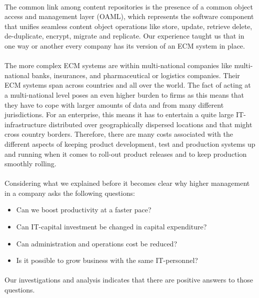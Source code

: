 \documentclass[EPiC]{easychair} %
\begin{document}
\paragraph{} The common link among content repositories is the presence of a common object access and management layer (OAML), which represents the software component that unifies seamless content object operations like store, update, retrieve delete, de-duplicate, encrypt, migrate and replicate. Our experience taught us that in one way or another every company has its version of an ECM system in place. 

\paragraph{} The more complex ECM systems are within multi-national companies like multi-national banks, insurances, and pharmaceutical or logistics companies. Their ECM systems span across countries and all over the world. The fact of acting at a multi-national level poses an even higher burden to firms as this means that they have to cope with larger amounts of data and from many different jurisdictions. For an enterprise, this means it has to entertain a quite large IT-infrastructure distributed over geographically dispersed locations and that might cross country borders. Therefore, there are many costs associated with the different aspects of keeping product development, test and production systems up and running when it comes to roll-out product releases and to keep production smoothly rolling. 

\paragraph{} Considering what we explained before it becomes clear why higher management in a company asks the following questions: 

\begin{itemize}
    \item Can we boost productivity at a faster pace?
    \item Can IT-capital investment be changed in capital expenditure?
    \item Can administration and operations cost be reduced?  
    \item Is it possible to grow business with the same IT-personnel?
\end{itemize}

\paragraph{}  Our investigations and analysis indicates that there are positive answers to those questions.
\end{document}

